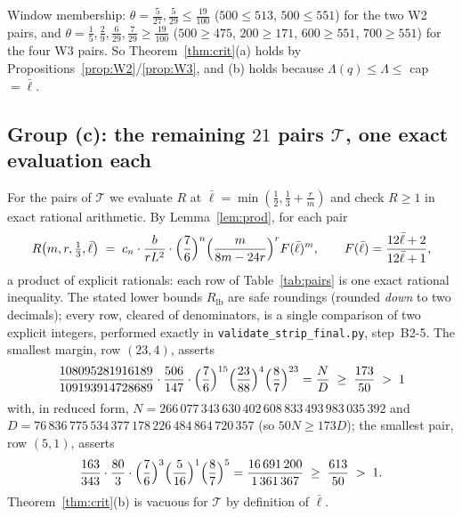 \documentclass[11pt]{amsart}
\theoremstyle{remark}
\newcommand{\lbar}{\bar\ell}
\newcommand{\Lhat}{\widehat\Lambda}
\begin{document}
Window membership: $\theta=\tfrac5{27},\tfrac5{29}\le\tfrac{19}{100}$ ($500\le513$, $500\le551$) for the two W2 pairs, and $\theta=\tfrac15,\tfrac29,\tfrac6{29},\tfrac7{29}\ge\tfrac{19}{100}$ ($500\ge475$, $200\ge171$, $600\ge551$, $700\ge551$) for the four W3 pairs.  So Theorem~\ref{thm:crit}(a) holds by Propositions~\ref{prop:W2}/\ref{prop:W3}, and (b) holds because $\Lambda(q)\le\Lhat\le$ cap $=\lbar$.

\subsection{Group (c): the remaining $21$ pairs $\mathcal T$, one exact evaluation each}\label{sec:grpC}
For the pairs of $\mathcal T$ we evaluate $R$ at $\lbar=\min(\tfrac12,\tfrac13+\tfrac rm)$ and check $R\ge1$ in exact rational arithmetic.  By Lemma~\ref{lem:prod}, for each pair
\begin{equation}\label{eq:row}
        R\bigl(m,r,\tfrac13,\lbar\bigr)
        \;=\;c_n\cdot\frac b{rL^2}\cdot\Bigl(\frac76\Bigr)^{n}
        \Bigl(\frac{m}{8m-24r}\Bigr)^{r} F(\lbar)^{m},
        \qquad F(\lbar)=\frac{12\lbar+2}{12\lbar+1},
\end{equation}
a product of explicit rationals: each row of Table~\ref{tab:pairs} is one exact rational inequality.  The stated lower bounds $R_{\mathrm{lb}}$ are safe roundings (rounded \emph{down} to two decimals); every row, cleared of denominators, is a single comparison of two explicit integers, performed exactly in \texttt{validate\_strip\_final.py}, step~B2-5.  The smallest margin, row $(23,4)$, asserts
\[
        \frac{108095281916189}{109193914728689}\cdot\frac{506}{147}\cdot
        \Bigl(\frac76\Bigr)^{15}\Bigl(\frac{23}{88}\Bigr)^{4}
        \Bigl(\frac87\Bigr)^{23}
        =\frac ND\;\ge\;\frac{173}{50}\;>\;1
\]
with, in reduced form, $N=266\,077\,343\,630\,402\,608\,833\,493\,983\,035\,392$ and $D=76\,836\,775\,534\,377\,178\,226\,484\,864\,720\,357$ (so $50N\ge173D$); the smallest pair, row $(5,1)$, asserts
\[
        \frac{163}{343}\cdot\frac{80}{3}\cdot\Bigl(\frac76\Bigr)^{3}
        \Bigl(\frac5{16}\Bigr)^{1}\Bigl(\frac87\Bigr)^{5}
        =\frac{16\,691\,200}{1\,361\,367}\;\ge\;\frac{613}{50}\;>\;1 .
\]
Theorem~\ref{thm:crit}(b) is vacuous for $\mathcal T$ by definition of $\lbar$.
\end{document}
